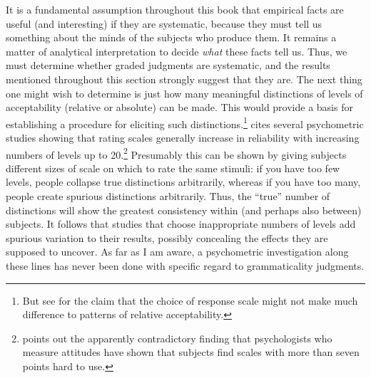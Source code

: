 It is a fundamental assumption throughout this book that empirical facts are useful (and interesting) if they are systematic, because they must tell us something about the minds of the subjects who produce them. It remains a matter of analytical interpretation to decide \textit{what} these facts tell us. Thus, we must determine whether graded judgments are systematic, and the results mentioned throughout this section strongly suggest that they are. The next thing one might wish to determine is just how many meaningful distinctions of levels of acceptability (relative or absolute) can be made. This would provide a basis for establishing a
procedure for eliciting such distinctions.\footnote{ But see \citet[7\textendash{}12, 70\textendash{}72]{Cowart1997} for the claim that the choice of response scale might not make much difference to patterns of relative acceptability.}
\citet{Chaudron1983} cites several psychometric studies showing that rating scales generally increase in reliability with increasing numbers of levels up to 20.\footnote{\citet{Snow1975} points out the apparently contradictory finding that psychologists who measure attitudes have shown that subjects find scales with more than seven points hard to use.}
 Presumably this can be shown by giving subjects different sizes of scale on which to rate the same stimuli: if you have too few levels, people collapse true distinctions arbitrarily, whereas if you have too many, people create spurious distinctions arbitrarily. Thus, the ``true'' number of distinctions will show the greatest consistency within (and perhaps also between) subjects. It follows that studies that choose inappropriate numbers of levels add spurious variation to their results, possibly concealing the effects they are supposed to uncover. As far as I am aware, a psychometric investigation along these lines has never been done with specific regard to grammaticality judgments.
 
